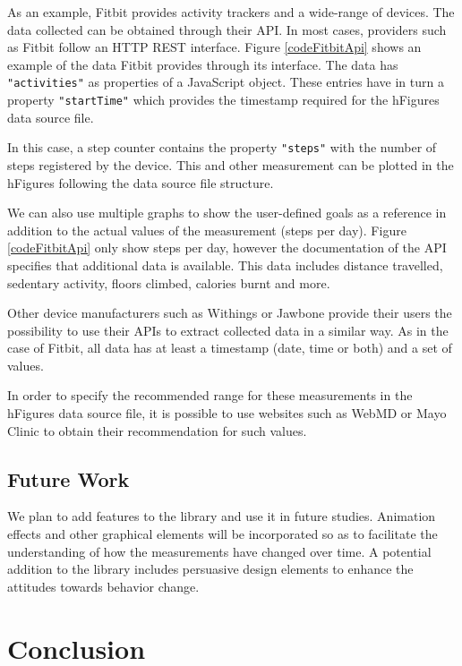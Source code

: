 \documentclass[twocolumn]{bmcart}%
\begin{document}
As an example, Fitbit provides activity trackers and a wide-range of devices. The data collected can be obtained through their API. In most cases, providers such as Fitbit follow an HTTP REST interface. Figure \ref{codeFitbitApi} shows an example of the data Fitbit provides through its interface. The data has \texttt{"activities"} as properties of a JavaScript object. These entries have in turn a property \texttt{"startTime"} which provides the timestamp required for the hFigures data source file.

In this case, a step counter contains the property \texttt{"steps"} with the number of steps registered by the device. This and other measurement can be plotted in the hFigures following the data source file structure.

We can also use multiple graphs to show the user-defined goals as a reference in addition to the actual values of the measurement (steps per day). Figure \ref{codeFitbitApi} only show steps per day, however the documentation of the API specifies that additional data is available. This data includes distance travelled, sedentary activity, floors climbed, calories burnt and more.

Other device manufacturers such as Withings or Jawbone provide their users the possibility to use their APIs to extract collected data in a similar way. As in the case of Fitbit, all data has at least a timestamp (date, time or both) and a set of values.

In order to specify the recommended range for these measurements in the hFigures data source file, it is possible to use websites such as WebMD or Mayo Clinic to obtain their recommendation for such values.

\subsection*{Future Work}

We plan to add features to the library and use it in future studies. Animation effects and other graphical elements will be incorporated so as to facilitate the understanding of how the measurements have changed over time. A potential addition to the library includes persuasive design elements to enhance the attitudes towards behavior change.

\section*{Conclusion}
\end{document}

